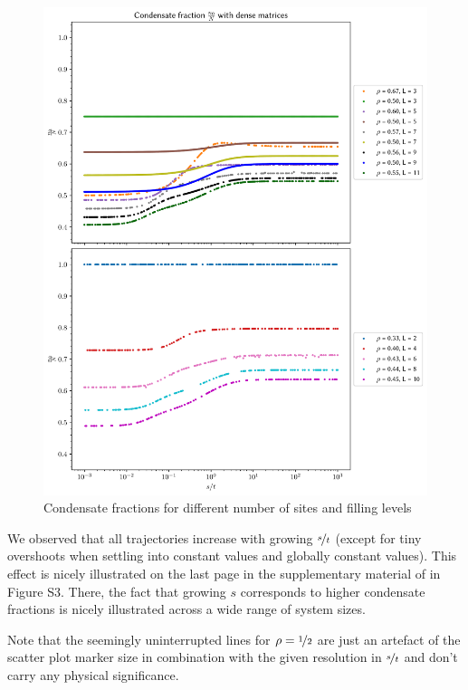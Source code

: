     \begin{figure}[t!]
        \centering
        \includegraphics[width=\textwidth]{graphics/condensate_fraction.pdf}
        \caption{Condensate fractions for different number of sites and filling levels}
        \label{fig:cond_frac}
    \end{figure}
    
    We observed that all trajectories increase with growing $\nicefrac{s}{t}$ (except for tiny overshoots when settling into constant values and globally constant values). This effect is nicely illustrated on the last page in the supplementary material of \cite{wilkeSymmetryprotectedBoseEinsteinCondensation2022} in Figure S3. There, the fact that growing $s$ corresponds to higher condensate fractions is nicely illustrated across a wide range of system sizes.

    Note that the seemingly uninterrupted lines for $\rho = \nicefrac{1}{2}$ are just an artefact of the scatter plot marker size in combination with the given resolution in $\nicefrac{s}{t}$ and don't carry any physical significance.

    